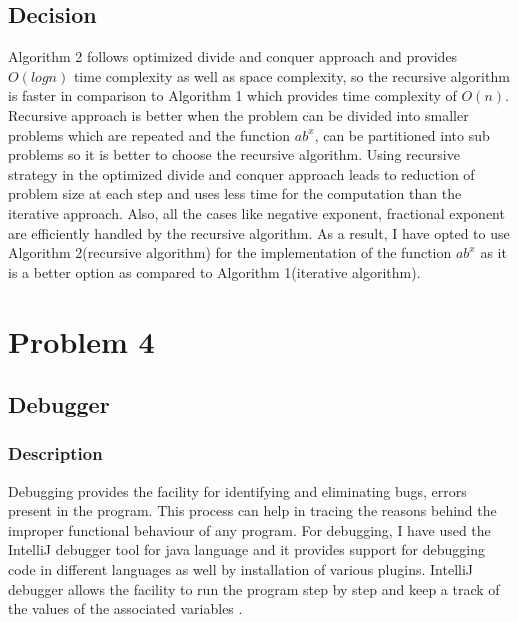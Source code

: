 \documentclass[12pt, a4paper]{article}
\begin{document}
\subsection*{Decision}
\noindent
Algorithm 2 follows optimized divide and conquer approach and provides $ O(logn) $ time complexity as well as space complexity, so the recursive algorithm is faster in comparison to Algorithm 1 which provides time complexity of $ O(n) $. Recursive approach is better when the problem can be divided into smaller problems which are repeated and the function $ ab^x $, can be partitioned into sub problems so it is better to choose the recursive algorithm. Using recursive strategy in the optimized divide and conquer approach leads to reduction of problem size at each step and uses less time for the computation than the iterative approach. Also, all the cases like negative exponent, fractional exponent are efficiently handled by the recursive algorithm. As a result, I have opted to use Algorithm 2(recursive algorithm) for the implementation of the function $ ab^x $ as it is a better option as compared to Algorithm 1(iterative algorithm).

\newpage


\section{Problem 4 }
\subsection{Debugger}
\subsubsection{Description}
Debugging provides the facility for identifying and eliminating bugs, errors present in the program. This process can help in tracing the reasons behind the improper functional behaviour of any program. For debugging, I have used the IntelliJ debugger tool for java language and it provides support for debugging code in different languages as well by installation of various plugins. IntelliJ debugger allows the facility to run the program step by step and keep a track of the values of the associated variables \cite{IntelliJ Debugger}.
\end{document}
